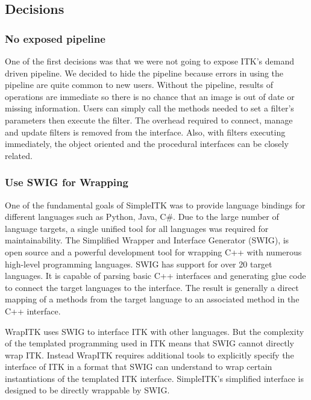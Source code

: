\documentclass{frontiersMED} %
\begin{document}
\subsection{Decisions}
\subsubsection{No exposed pipeline}
One of the first decisions was that we were not going to expose ITK's
demand driven pipeline. We decided to hide the pipeline because errors
in using the pipeline are quite common to new users. Without the
pipeline, results of operations are immediate so there is no chance
that an image is out of date or missing information. Users can simply
call the methods needed to set a filter's parameters then execute the
filter.  The overhead required to connect, manage and update filters
is removed from the interface. Also, with filters executing
immediately, the object oriented and the procedural interfaces can be
closely related.

\subsubsection{Use SWIG for Wrapping}
One of the fundamental goals of SimpleITK was to provide language
bindings for different languages such as Python, Java, C\#. Due to the
large number of language targets, a single unified tool for all
languages was required for maintainability. The Simplified Wrapper and
Interface Generator (SWIG), is open source and a powerful
development tool for wrapping C++ with numerous high-level programming
languages. SWIG has support for over 20 target languages. It is
capable of parsing basic C++ interfaces and generating glue code to
connect the target languages to the interface. The result is generally
a direct mapping of a methods from the target language to an
associated method in the C++ interface.

WrapITK uses SWIG to interface ITK with other languages.  But the
complexity of the templated programming used in ITK means that SWIG
cannot directly wrap ITK.  Instead WrapITK requires additional tools
to explicitly specify the interface of ITK in a format that SWIG can
understand to wrap certain instantiations of the templated ITK
interface. SimpleITK's simplified interface is designed to be directly
wrappable by SWIG.
\end{document}
